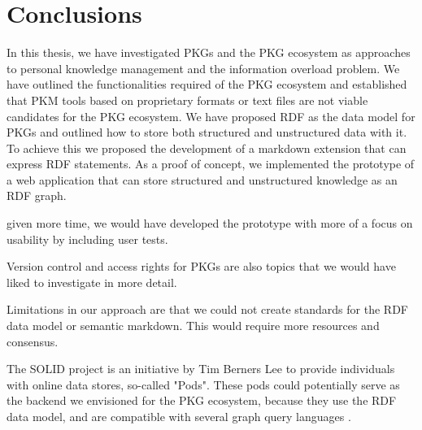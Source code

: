 \chapter{Conclusions} \label{ch:conclusions}

In this thesis, we have investigated PKGs and the PKG ecosystem as approaches to personal knowledge management and the information overload problem. 
We have outlined the functionalities required of the PKG ecosystem and established that PKM tools based on proprietary formats or text files are not viable candidates for the PKG ecosystem. We have proposed RDF as the data model for PKGs and outlined how to store both structured and unstructured data with it. To achieve this we proposed the development of a markdown extension that can express RDF statements. As a proof of concept, we implemented the prototype of a web application that can store structured and unstructured knowledge as an RDF graph.

given more time, we would have developed the prototype with more of a focus on usability by including user tests.

Version control and access rights for PKGs are also topics that we would have liked to investigate in more detail.

Limitations in our approach are that we could not create standards for the RDF data model or semantic markdown. This would require more resources and consensus.

The SOLID project is an initiative by Tim Berners Lee to provide individuals with online data stores, so-called "Pods". These pods could potentially serve as the backend we envisioned for the PKG ecosystem, because they use the RDF data model, and are compatible with several graph query languages \cite{solid}. 
